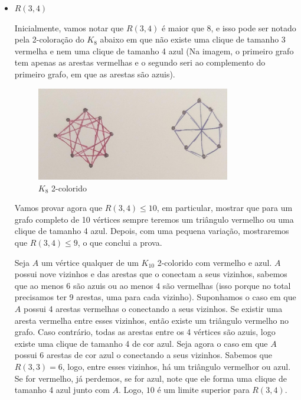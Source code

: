 \documentclass{article}
\begin{document}
\begin{itemize}
\begin{itemize}
			\item \(R(3, 4)\)

				Inicialmente, vamos notar que \(R(3, 4)\) é maior que 8, e isso pode ser notado pela 2-coloração do \(K_8\) abaixo em que
				não existe uma clique de tamanho 3 vermelha e nem uma clique de tamanho 4 azul (Na imagem, o primeiro grafo tem apenas as arestas vermelhas
				e o segundo seri ao complemento do primeiro grafo, em que as arestas são azuis).

			                  \begin{figure}[H]
				                  \centering
				                  \includegraphics[width=0.8\textwidth]{images/1b.jpeg}
								  \caption{\(K_8\) 2-colorido}
			                  \end{figure}

				Vamos provar agora que \(R(3, 4) \leq 10\), em particular, mostrar que para um grafo completo de 10 vértices sempre teremos um triângulo
				vermelho ou uma clique de tamanho 4 azul. Depois, com uma pequena variação, mostraremos que \(R(3,4) \leq 9\), o que conclui a prova.

				Seja \(A\) um vértice qualquer de um \(K_{10}\) 2-colorido com vermelho e azul. \(A\) possui nove vizinhos e das arestas que o conectam a seus vizinhos,
				sabemos que ao menos 6 são azuis ou ao menos 4 são vermelhas (isso porque no total precisamos ter 9 arestas, uma para cada vizinho). Suponhamos o caso em que
				\(A\) possui 4 arestas vermelhas o conectando a seus vizinhos. Se existir uma aresta vermelha entre esses vizinhos, então existe um triângulo vermelho no grafo. Caso
				contrário, todas as arestas entre os 4 vértices são azuis, logo existe uma clique de tamanho 4 de cor azul. Seja agora o caso em que \(A\) possui
				6 arestas de cor azul o conectando a seus vizinhos. Sabemos que \(R(3, 3) = 6\), logo, entre esses vizinhos, há um triângulo vermelhor ou azul. Se for vermelho,
				já perdemos, se for azul, note que ele forma uma clique de tamanho 4 azul junto com \(A\). Logo, \(10\) é um limite superior para \(R(3, 4)\).
				

\end{itemize}
\end{itemize}
\end{document}
